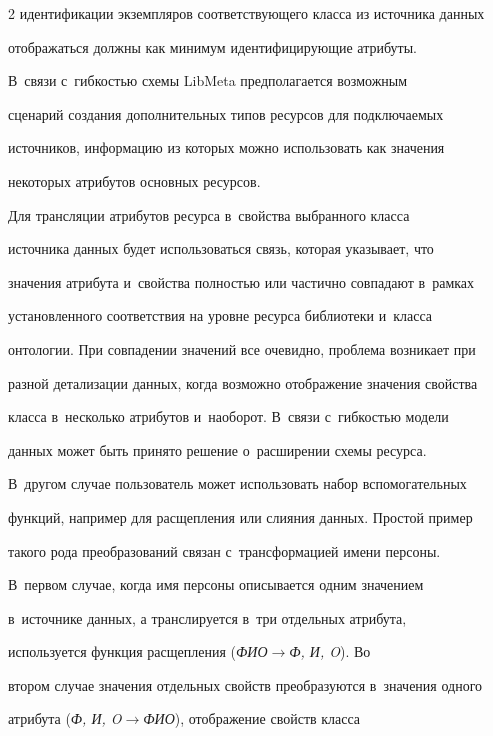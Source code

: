 \begin{multicols}{2}
идентификации экземпляров соответствующего класса из источника данных 

отображаться должны как минимум идентифицирующие атри\-буты. 



    

    В~связи с~гибкостью схемы LibMeta предполагается возможным 

сценарий создания дополнительных типов ресурсов для подключаемых 

источников, информацию из которых можно использовать как значения 

некоторых атрибутов основных ресурсов.

{



}

    

    Для трансляции атрибутов ресурса в~свойства выбранного класса 

источника данных будет использоваться связь, которая указывает, что 

значения атрибута и~свойства полностью или частично совпадают в~рамках 

установленного соответствия на уровне ресурса библиотеки и~класса 

онтологии. При совпадении значений все очевидно, проблема возникает при 

разной детализации данных, когда возможно отображение значения свойства 

класса в~несколько атрибутов и~наоборот. В~связи с~гиб\-костью модели 

данных может быть принято решение о~расширении схемы ресурса. 

В~другом случае пользователь может использовать набор вспомогательных 

функций, например для расщепления или слияния данных. Простой пример 

такого рода преобразований связан с~трансформацией имени персоны. 

В~первом случае, когда имя персоны описывается одним значением 

в~источнике данных, а транслируется в~три отдельных атрибута, 

используется функция расщепления (\textit{ФИО}\;$\to$\;\textit{Ф, И, O}). Во 

втором случае значения отдельных свойств преобразуются в~значения одного 

атрибута (\textit{Ф, И, O}\;$\to$\;\textit{ФИО}), отображение свойств класса 


\end{multicols}
